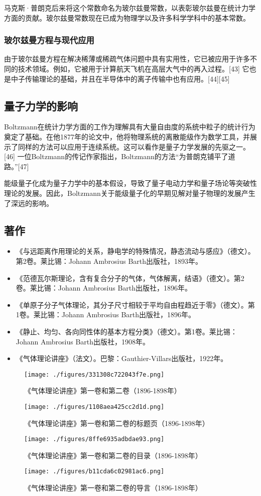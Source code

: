 马克斯·普朗克后来将这个常数命名为玻尔兹曼常数，以表彰玻尔兹曼在统计力学方面的贡献。玻尔兹曼常数现在已成为物理学以及许多科学学科中的基本常数。
\subsubsection{玻尔兹曼方程与现代应用}
由于玻尔兹曼方程在解决稀薄或稀疏气体问题中具有实用性，它已被应用于许多不同的技术领域。例如，它被用于计算航天飞机在高层大气中的再入过程。[43] 它也是中子传输理论的基础，并且在半导体中的离子传输中也有应用。[44][45]
\subsection{量子力学的影响}
Boltzmann在统计力学方面的工作为理解具有大量自由度的系统中粒子的统计行为奠定了基础。在他1877年的论文中，他将物理系统的离散能级作为数学工具，并展示了同样的方法可以应用于连续系统。这可以看作是量子力学发展的先驱之一。[46] 一位Boltzmann的传记作家指出，Boltzmann的方法“为普朗克铺平了道路。”[47]  

能级量子化成为量子力学中的基本假设，导致了量子电动力学和量子场论等突破性理论的发展。因此，Boltzmann关于能级量子化的早期见解对量子物理的发展产生了深远的影响。
\subsection{著作}
\begin{itemize}
\item 《与远距离作用理论的关系，静电学的特殊情况，静态流动与感应》（德文）。第2卷。莱比锡：Johann Ambrosius Barth出版社，1893年。
\item 《范德瓦尔斯理论，含有复合分子的气体，气体解离，结语》（德文）。第2卷。莱比锡：Johann Ambrosius Barth出版社，1896年。
\item 《单原子分子气体理论，其分子尺寸相较于平均自由程趋近于零》（德文）。第1卷。莱比锡：Johann Ambrosius Barth出版社，1896年。
\item 《静止、均匀、各向同性体的基本方程分类》（德文）。第1卷。莱比锡：Johann Ambrosius Barth出版社，1908年。
\item 《气体理论讲座》（法文）。巴黎：Gauthier-Villars出版社，1922年。
\end{itemize}
\begin{figure}[ht]
\centering
\texttt{[image: ./figures/331308c722043f7e.png]}
\caption{《气体理论讲座》第一卷和第二卷（1896-1898年）} \label{fig_BRZM_6}
\end{figure}
\begin{figure}[ht]
\centering
\texttt{[image: ./figures/1108aea425cc2d1d.png]}
\caption{《气体理论讲座》第一卷和第二卷的标题页（1896-1898年）} \label{fig_BRZM_7}
\end{figure}
\begin{figure}[ht]
\centering
\texttt{[image: ./figures/8ffe6935adbdae93.png]}
\caption{《气体理论讲座》第一卷和第二卷的目录（1896-1898年）} \label{fig_BRZM_8}
\end{figure}
\begin{figure}[ht]
\centering
\texttt{[image: ./figures/b11cda6c02981ac6.png]}
\caption{《气体理论讲座》第一卷和第二卷的导言（1896-1898年）} \label{fig_BRZM_9}
\end{figure}
